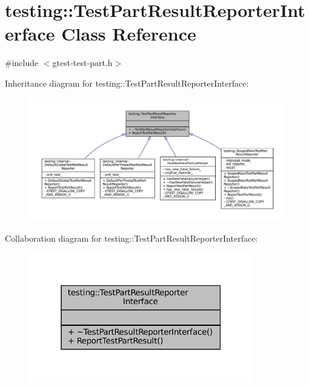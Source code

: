 \hypertarget{classtesting_1_1TestPartResultReporterInterface}{}\section{testing\+:\+:Test\+Part\+Result\+Reporter\+Interface Class Reference}
\label{classtesting_1_1TestPartResultReporterInterface}


{\ttfamily \#include $<$gtest-\/test-\/part.\+h$>$}



Inheritance diagram for testing\+:\+:Test\+Part\+Result\+Reporter\+Interface\+:
\nopagebreak
\begin{figure}[H]
\begin{center}
\leavevmode
\includegraphics[width=350pt]{classtesting_1_1TestPartResultReporterInterface__inherit__graph}
\end{center}
\end{figure}


Collaboration diagram for testing\+:\+:Test\+Part\+Result\+Reporter\+Interface\+:
\nopagebreak
\begin{figure}[H]
\begin{center}
\leavevmode
\includegraphics[width=277pt]{classtesting_1_1TestPartResultReporterInterface__coll__graph}
\end{center}
\end{figure}
